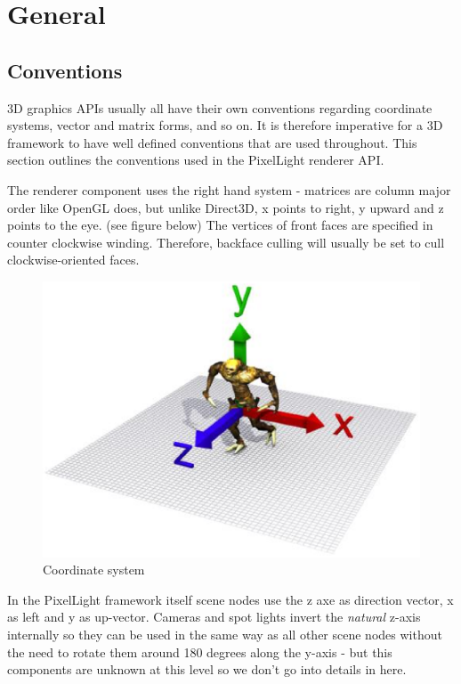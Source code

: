 \chapter{General}




\section{Conventions}
3D graphics APIs usually all have their own conventions regarding coordinate systems, vector and matrix forms, and so on. It is therefore imperative for a 3D framework to have well defined conventions that are used throughout. This section outlines the conventions used in the PixelLight renderer API.

The renderer component uses the right hand system - matrices are column major order like OpenGL does, but unlike Direct3D, x points to right, y upward and z points to the eye. (see figure below) The vertices of front faces are specified in counter clockwise winding. Therefore, backface culling will usually be set to cull clockwise-oriented faces.

\begin{figure}
  \centering
  \includegraphics[scale=0.7]{pics/CoordinateSystem.eps}
  \caption{Coordinate system}
  \label{fig:Coordinate system}
\end{figure}

In the PixelLight framework itself scene nodes use the z axe as direction vector, x as left and y as up-vector. Cameras and spot lights invert the \emph{natural} z-axis internally so they can be used in the same way as all other scene nodes without the need to rotate them around 180 degrees along the y-axis - but this components are unknown at this level so we don't go into details in here.




